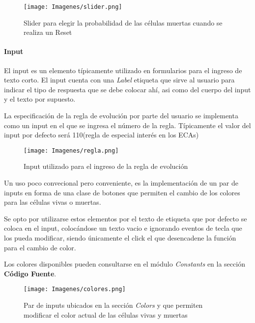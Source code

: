 \documentclass[]{article}
\begin{document}
				\begin{figure}[!h]
					\centering
					\texttt{[image: Imagenes/slider.png]}
					\caption{Slider para elegir la probabilidad de las células muertas cuando se realiza un Reset}
					\label{Slider}
				\end{figure}
				
				\paragraph{Input}
				\justifying
				El input es un elemento típicamente utilizado en formularios para el ingreso de texto corto. El input cuenta con una \textit{Label} etiqueta que sirve al usuario para indicar el tipo de respuesta que se debe colocar ahí, asi como del cuerpo del input y el texto por supuesto.
				
				\hfill\break
				\justifying
				La especificación de la regla de evolución por parte del usuario se implementa como un input en el que se ingresa el número de la regla.
				Típicamente el valor del input por defecto será 110(regla de especial interés en los ECAs)
				
				\hfill\break
				\begin{figure}[!h]
					\centering
					\texttt{[image: Imagenes/regla.png]}
					\caption{Input utilizado para el ingreso de la regla de evolución}
					\label{Rule}
				\end{figure}
				
				\hfill\break
				\justifying
				Un uso poco convecional pero conveniente, es la implementación de un par de inputs en forma de una clase de botones que permiten el cambio de los colores para las células vivas o muertas.
				
				\hfill\break
				\justifying
				Se opto por utilizarse estos elementos por el texto de etiqueta que por defecto se coloca en el input, colocándose un texto vacio e ignorando eventos de tecla que los pueda modificar, siendo únicamente el click el que desencadene la función para el cambio de color.
				
				\hfill\break
				\justifying
				Los colores disponibles pueden consultarse en el módulo \textit{Constants} en la sección \textbf{Código Fuente}.
				
				\begin{figure}[!h]
					\centering
					\texttt{[image: Imagenes/colores.png]}
					\caption{Par de inputs ubicados en la sección \textit{Colors} y que permiten modificar el color actual de las células vivas y muertas}
					\label{Colores_celulas}
				\end{figure}
				
\end{document}
